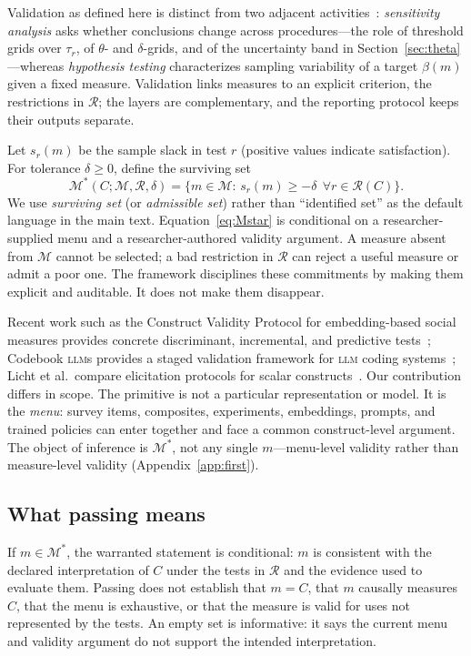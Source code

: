 \documentclass[10pt,letterpaper]{article}
\newcommand{\LLM}{\textsc{llm}}
\newcommand{\M}{\ensuremath{\mathcal{M}}}
\newcommand{\Rset}{\mathcal{R}}
\begin{document}
Validation as defined here is distinct from two adjacent activities~\cite{dellrambachan2026}: \emph{sensitivity analysis} asks whether conclusions change across procedures---the role of threshold grids over $\tau_r$, of $\theta$- and $\delta$-grids, and of the uncertainty band in Section~\ref{sec:theta}---whereas \emph{hypothesis testing} characterizes sampling variability of a target $\beta(m)$ given a fixed measure.
Validation links measures to an explicit criterion, the restrictions in $\Rset$; the layers are complementary, and the reporting protocol keeps their outputs separate.

Let $s_r(m)$ be the sample slack in test $r$ (positive values indicate satisfaction).
For tolerance $\delta\ge 0$, define the surviving set
\begin{equation}
\M^*(C;\M,\Rset,\delta)
=\bigl\{m\in\M:\, s_r(m)\ge -\delta\ \ \forall r\in\Rset(C)\bigr\}.
\label{eq:Mstar}
\end{equation}
We use \emph{surviving set} (or \emph{admissible set}) rather than ``identified set'' as the default language in the main text.
Equation~\eqref{eq:Mstar} is conditional on a researcher-supplied menu and a researcher-authored validity argument.
A measure absent from $\M$ cannot be selected; a bad restriction in $\Rset$ can reject a useful measure or admit a poor one.
The framework disciplines these commitments by making them explicit and auditable.
It does not make them disappear.

Recent work such as the Construct Validity Protocol for embedding-based social measures provides concrete discriminant, incremental, and predictive tests~\cite{proxy2026}; Codebook \LLM{}s provides a staged validation framework for \LLM{} coding systems~\cite{halterman2024}; Licht et al.\ compare elicitation protocols for scalar constructs~\cite{licht2025}.
Our contribution differs in scope.
The primitive is not a particular representation or model.
It is the \emph{menu}: survey items, composites, experiments, embeddings, prompts, and trained policies can enter together and face a common construct-level argument.
The object of inference is $\M^*$, not any single $m$---menu-level validity rather than measure-level validity (Appendix~\ref{app:first}).

\subsection{What passing means}
If $m\in\M^*$, the warranted statement is conditional: $m$ is consistent with the declared interpretation of $C$ under the tests in $\Rset$ and the evidence used to evaluate them.
Passing does not establish that $m=C$, that $m$ causally measures $C$, that the menu is exhaustive, or that the measure is valid for uses not represented by the tests.
An empty set is informative: it says the current menu and validity argument do not support the intended interpretation.
\end{document}
